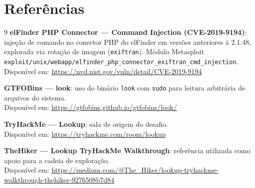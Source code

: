 \documentclass[12pt]{article}
\begin{document}
\section{Referências}

\begin{thebibliography}{9}
    \textbf{elFinder PHP Connector --- Command Injection (CVE-2019-9194)}: injeção de comando no conector PHP do elFinder em versões anteriores à 2.1.48, explorada via rotação de imagem (\texttt{exiftran}). Módulo Metasploit \texttt{exploit/unix/webapp/elfinder\_php\_connector\_exiftran\_cmd\_injection}. \\
    Disponível em: \url{https://nvd.nist.gov/vuln/detail/CVE-2019-9194}

    \textbf{GTFOBins --- look}: uso do binário \texttt{look} com \texttt{sudo} para leitura arbitrária de arquivos do sistema. \\
    Disponível em: \url{https://gtfobins.github.io/gtfobins/look/}

    \textbf{TryHackMe --- Lookup}: sala de origem do desafio. \\
    Disponível em: \url{https://tryhackme.com/room/lookup}

    \textbf{TheHiker --- Lookup TryHackMe Walkthrough}: referência utilizada como apoio para a cadeia de exploração. \\
    Disponível em: \url{https://medium.com/@The_Hiker/lookup-tryhackme-walkthrough-thehiker-9276508b7d84}

\end{thebibliography}
\end{document}
